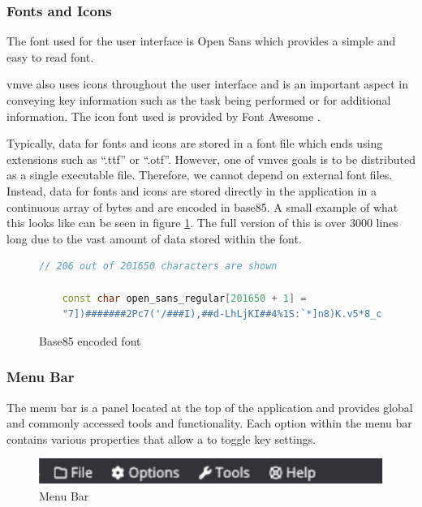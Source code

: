 \documentclass[11pt]{article}
\begin{document}
\subsubsection{Fonts and Icons}
The font used for the user interface is Open Sans which provides a simple and
easy to read font.

\gls*{vmve} also uses icons throughout the user interface and is an important
aspect in conveying key information such as the task being performed or for
additional information. The icon font used is provided by Font Awesome
\cite{font-awesome}.

Typically, data for fonts and icons are stored in a font file which ends using
extensions such as ``.ttf'' or ``.otf''. However, one of \glspl*{vmve} goals is
to be distributed as a single executable file. Therefore, we cannot depend on
external font files. Instead, data for fonts and icons are stored directly in
the application in a continuous array of bytes and are encoded in base85. A
small example of what this looks like can be seen in figure
\ref{fig:base85_font}. The full version of this is over 3000 lines long due to
the vast amount of data stored within the font.

\begin{figure}[H]
  \centering
  \begin{lstlisting}[language=C++]
    // 206 out of 201650 characters are shown

    const char open_sans_regular[201650 + 1] =
    "7])#######2Pc7('/###I),##d-LhLjKI##4%1S:`*]n8)K.v5*8_c)iZ;99=$$$$c(m]4pKdp/(RdL<snZo'oI,hLNDnx4Uu/>8Q7oo^eFb3hB4JYc'Tx-3l_wgd2Tf._r+&sAqV,-G"":F8LD=5,n]A&aA+<gXG-<iobW&>$>QJ8Z.W$jg0Fv-o^(^JJnf4T"
  \end{lstlisting}
  \caption{Base85 encoded font}
  \label{fig:base85_font}
\end{figure}

\subsubsection{Menu Bar}
The menu bar is a panel located at the top of the application and provides
global and commonly accessed tools and functionality. Each option within the 
menu bar contains various properties that allow a to toggle key settings.
\begin{figure}[H]
  \centering
  \includegraphics[width=\textwidth]{images/menu_bar.png}
  \caption{Menu Bar}
  \label{fig:menu_bar}
\end{figure}
\end{document}
